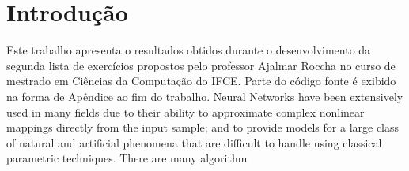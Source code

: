 \documentclass[
	article,			%
	11pt,				%
	oneside,			%
	a4paper,			%
	english,			%
	brazil,				%
	sumario=tradicional
	]{abntex2}
\begin{document}



%
%
\maketitle
\frenchspacing 



\textual

\section*{Introdução}
Este trabalho apresenta o resultados obtidos durante o desenvolvimento da
segunda lista de exercícios propostos pelo professor Ajalmar Roccha no curso de
mestrado em Ciências da Computação do IFCE. Parte do código fonte é exibido na
forma de Apêndice ao fim do trabalho.
   Neural Networks have been extensively used in many fields due to their ability
to approximate complex nonlinear mappings directly from the input sample; and
to provide models for a large class of natural and artificial phenomena that are
difficult to handle using classical parametric techniques. There are many algorithm
\end{document}
